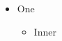 \documentclass{llncs}
\begin{document}
\begin{itemize}
\item One
  \begin{itemize}\item Inner\end{itemize}
\end{itemize}
\end{document}
